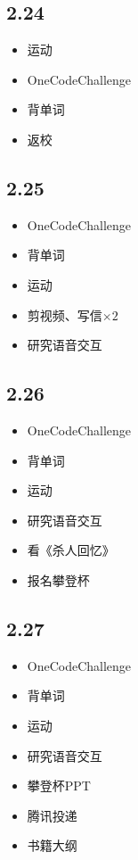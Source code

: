 \documentclass[UTF8]{ctexart}
\begin{document}
\subsection*{2.24}
\begin{itemize}
    \item 运动
    \item OneCodeChallenge
    \item 背单词
    \item 返校
\end{itemize}

\subsection*{2.25}
\begin{itemize}
    \item OneCodeChallenge
    \item 背单词
    \item 运动
    \item 剪视频、写信$\times 2$
    \item 研究语音交互
\end{itemize}

\subsection*{2.26}
\begin{itemize}
    \item OneCodeChallenge
    \item 背单词
    \item 运动
    \item 研究语音交互
    \item 看《杀人回忆》
    \item 报名攀登杯
\end{itemize}

\subsection*{2.27}
\begin{itemize}
    \item OneCodeChallenge
    \item 背单词
    \item 运动
    \item 研究语音交互
    \item 攀登杯PPT
    \item 腾讯投递
    \item 书籍大纲
\end{itemize}
\end{document}
